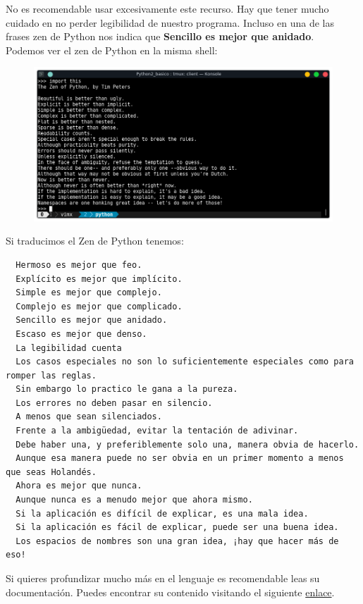 \documentclass{article}
\begin{document}
No es recomendable usar excesivamente este recurso. Hay que tener mucho cuidado
en no perder legibilidad de nuestro programa. Incluso en una de las frases zen
de Python nos indica que \textbf{Sencillo es mejor que anidado}.\\

Podemos ver el zen de Python en la misma shell:

\begin{figure}[h!]
  \centering
  \includegraphics[scale=0.75]{./Pictures/028_import_this.png}
\end{figure}

Si traducimos el Zen de Python tenemos:

\begin{verbatim}
  Hermoso es mejor que feo.
  Explícito es mejor que implícito.
  Simple es mejor que complejo.
  Complejo es mejor que complicado.
  Sencillo es mejor que anidado.
  Escaso es mejor que denso.
  La legibilidad cuenta
  Los casos especiales no son lo suficientemente especiales como para romper las reglas.
  Sin embargo lo practico le gana a la pureza.
  Los errores no deben pasar en silencio.
  A menos que sean silenciados.
  Frente a la ambigüedad, evitar la tentación de adivinar.
  Debe haber una, y preferiblemente solo una, manera obvia de hacerlo.
  Aunque esa manera puede no ser obvia en un primer momento a menos que seas Holandés.
  Ahora es mejor que nunca.
  Aunque nunca es a menudo mejor que ahora mismo.
  Si la aplicación es difícil de explicar, es una mala idea.
  Si la aplicación es fácil de explicar, puede ser una buena idea.
  Los espacios de nombres son una gran idea, ¡hay que hacer más de eso!
\end{verbatim}

Si quieres profundizar mucho más en el lenguaje es recomendable leas su
documentación. Puedes encontrar su contenido visitando el siguiente
\href{https://docs.python.org/3/}{enlace}.
\end{document}
